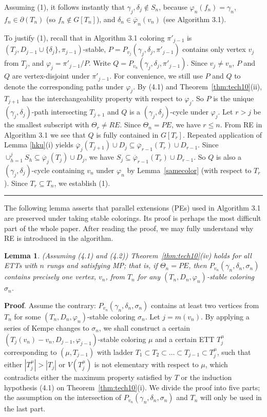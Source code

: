 \documentclass[11pt]{article}
\newtheorem{lemma}[theorem]{Lemma}
\newcommand{\phibar}{\overline{\varphi}}
\newcommand{\phiv}{\varphi}
\def\qed{\hfill \rule{4pt}{7pt}}
\begin{document}
\noindent Assuming (1), it follows instantly that $\gamma_j,\delta_j\notin S_n$, because $\varphi_n(f_n)=\gamma_n$, $f_n\in \partial(T_n)$ (so $f_n\notin G[T_n]$), 
and $\delta_n\in\phibar_{n}(v_n)$ (see Algorithm 3.1).  

To justify (1), recall that in Algorithm 3.1 coloring $\pi'_{j-1}$ is $(T_j, D_{j-1}\cup\{\delta_j\},\pi_{j-1})$-stable, 
$P=P_{v_j}(\gamma_j, \delta_j, \pi'_{j-1})$ contains only vertex $v_j$ from $T_j$, and $\phiv_j = \pi'_{j-1}/P$.
Write $Q=P_{v_n}(\gamma_j, \delta_j, \pi'_{j-1})$. Since $v_j\neq v_n$, $P$ and $Q$ are vertex-disjoint under $\pi'_{j-1}$.
For convenience, we still use $P$ and $Q$ to denote the corresponding paths under $\phiv_j$.  
By (4.1) and Theorem~\ref{thm:tech10}(ii), $T_{j+1}$ has the interchangeability property with 
respect to $\phiv_j$. So $P$ is the unique $(\gamma_j, \delta_j)$-path intersecting $T_{j+1}$ and $Q$ is a $(\gamma_j, \delta_j)$-cycle 
under $\phiv_j$.  Let $r>j$ be the smallest subscript with $\Theta_r \ne RE$. Since $\Theta_n = PE$, we have $r \le n$. From RE in Algorithm 3.1
we see that $Q$ is fully contained in $G[T_r]$.  Repeated application of Lemma \ref{hku}(i) yields  $\phibar_j(T_{j+1})\cup D_j \subseteq 
\phibar_{r-1}(T_r)\cup D_{r-1}$. Since  $\cup_{h=1}^j S_h \subseteq  \phibar_j(T_j) \cup D_j $, we have $S_j \subseteq \phibar_{r-1}(T_r)\cup D_{r-1}$. 
So $Q$ is also a $(\gamma_j, \delta_j)$-cycle containing $v_n$ under $\phiv_n$ by Lemma~\ref{samecolor} (with respect to $T_r$). Since 
$T_r \subseteq T_n$, we establish (1). \qed

\vskip 3mm
The following lemma asserts that parallel extensions (PEs) used in Algorithm 3.1 are preserved under taking stable 
colorings. Its proof is perhaps the most difficult part of the whole paper. After reading the 
proof, we may fully understand why RE is introduced in 
the algorithm.  

\begin{lemma}\label{extension base}
(Assuming (4.1) and (4.2)) Theorem~\ref{thm:tech10}(iv) holds for all ETTs with $n$ rungs and  satisfying MP; 
that is, if $\Theta_n = PE$, then $P_{v_n}(\gamma_n, \delta_n, \sigma_n)$ contains precisely one vertex,
$v_n$, from $T_n$ for any $(T_n, D_n, \phiv_n)$-stable coloring $\sigma_n$.
\end{lemma}

{\bf Proof}. Assume the contrary: $P_{v_n}(\gamma_n, \delta_n, \sigma_n)$ contains at least two vertices
from $T_n$ for some $(T_n, D_n, \phiv_n)$-stable coloring $\sigma_n$.  Let $j=m(v_n)$.  By applying a series
of Kempe changes to $\sigma_n$, we shall construct a certain $(T_j(v_n) - v_n, D_{j-1}, \phiv_{j-1})$-stable 
coloring $\mu$ and a certain ETT $T_j^{\mu}$ corresponding to $(\mu, T_{j-1})$ with ladder $T_1\subset T_2\subset \ldots \subset T_{j-1} 
\subset T_j^{\mu}$, such that either $|T_j^{\mu}| > |T_j|$ or $V(T_j^{\mu})$ is not elementary with respect to $\mu$, which
contradicts either the maximum property satisfied by $T$ or the induction hypothesis (4.1) on Theorem~\ref{thm:tech10}(i). 
We divide the proof into five parts; the assumption on the intersection of $P_{v_n}(\gamma_n, \delta_n, \sigma_n)$ 
and $T_n$ will only be used in the last part.
\end{document}
